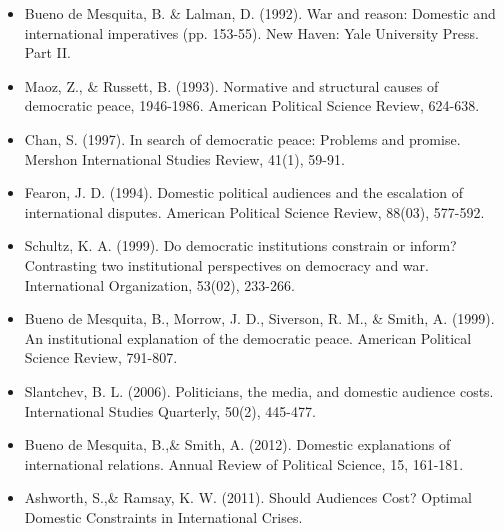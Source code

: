 \documentclass[12pt,a4paper]{article}
\begin{document}
\begin{itemize}
	\item Bueno de Mesquita, B. \& Lalman, D. (1992). War and reason: Domestic and international imperatives (pp. 153-55). New Haven: Yale University Press.  Part II.
	\item Maoz, Z., \& Russett, B. (1993). Normative and structural causes of democratic peace, 1946-1986. American Political Science Review, 624-638.
	\item Chan, S. (1997). In search of democratic peace: Problems and promise. Mershon International Studies Review, 41(1), 59-91. 
	\item Fearon, J. D. (1994). Domestic political audiences and the escalation of international disputes. American Political Science Review, 88(03), 577-592.
	\item Schultz, K. A. (1999). Do democratic institutions constrain or inform? Contrasting two institutional perspectives on democracy and war. International Organization, 53(02), 233-266. 
	\item Bueno de Mesquita, B., Morrow, J. D., Siverson, R. M., \& Smith, A. (1999). An institutional explanation of the democratic peace. American Political Science Review, 791-807.
	\item Slantchev, B. L. (2006). Politicians, the media, and domestic audience costs. International Studies Quarterly, 50(2), 445-477.
	\item Bueno de Mesquita, B.,\& Smith, A. (2012). Domestic explanations of international relations. Annual Review of Political Science, 15, 161-181.
	\item Ashworth, S.,\& Ramsay, K. W. (2011). Should Audiences Cost? Optimal Domestic Constraints in International Crises.
\end{itemize}




\end{document}
